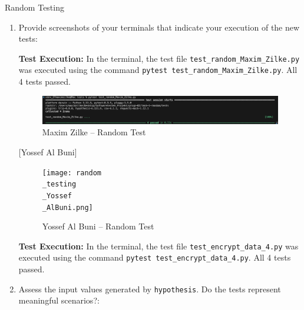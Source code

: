 \documentclass[a4paper]{scrreprt}
\newcounter{question}
\begin{document}
\begin{question}{Random Testing}
\begin{enumerate}[topsep=0pt, leftmargin=*]
    \item Provide screenshots of your terminals that indicate your execution of the new tests:
          \begin{answer}
            \textbf{Test Execution:} In the terminal, the test file \texttt{test\_random\_Maxim\_Zilke.py} was executed using the command \texttt{pytest test\_random\_Maxim\_Zilke.py}. All 4 tests passed.
            \begin{figure}[h]
                \centering
                \includegraphics[width=1\textwidth]{test_isp_Maxim_Zilke.png} 
                \caption{Maxim Zilke – Random Test}
                \label{fig:maxim-random-test}
            \end{figure}
        [Yossef Al Buni] \\
    \begin{figure}[H]
        \centering
        \texttt{[image: random\\\_testing\\\_Yossef\\\_AlBuni.png]} 
        \caption{Yossef Al Buni – Random Test}
        \label{fig:maxim-random-test}
    \end{figure}
    \textbf{Test Execution:} In the terminal, the test file \texttt{test\_encrypt\_data\_4.py} was executed using the command \texttt{pytest test\_encrypt\_data\_4.py}. All 4 tests passed. \\
          \end{answer}


          
    \item Assess the input values generated by \texttt{hypothesis}. Do the tests represent meaningful scenarios?:
          \begin{answer}
        

\end{answer}
\end{enumerate}
\end{question}
\end{document}
